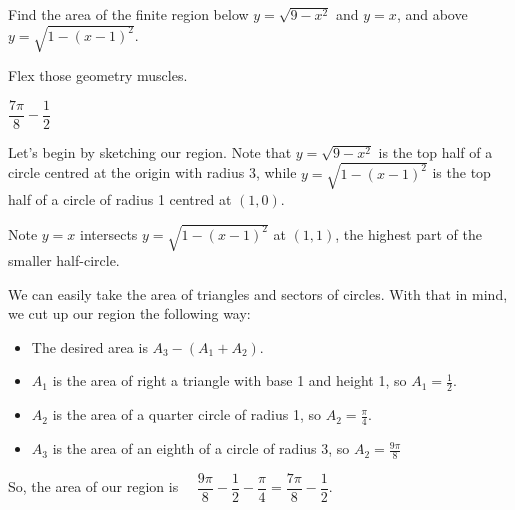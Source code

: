 \begin{question}
Find the area of the finite region below $y=\sqrt{9-x^2}$ and $y=x$, and above  $y=\sqrt{1-(x-1)^2}$.
\end{question}
\begin{hint}
Flex those geometry muscles.
\end{hint}
\begin{answer}
$\dfrac{7\pi}{8}-\dfrac{1}{2}$
\end{answer}
\begin{solution}
Let's begin by sketching our region. Note that $y=\sqrt{9-x^2}$ is the top half of a circle centred at the origin with radius 3, while $y=\sqrt{1-(x-1)^2}$ is the top half of a circle of radius 1 centred at $(1,0)$.
\begin{center}
\end{center}

Note $y=x$ intersects $y=\sqrt{1-(x-1)^2}$ at $(1,1)$, the highest part of the smaller half-circle.

We can easily take the area of  triangles and sectors of circles. With that in mind, we cut up our region the following way:

\begin{center}
\end{center}
\begin{itemize}
\item The desired area is $A_3-(A_1+A_2)$.
\item $A_1$ is the area of right a triangle with base 1 and height 1, so $A_1 = \frac{1}{2}$.
\item $A_2$ is the area of a quarter circle of radius 1, so $A_2=\frac{\pi}{4}$.
\item $A_3$ is the area of an eighth of a circle of radius 3, so $A_2 = \frac{9\pi}{8}$
\end{itemize}
So, the area of our region is~~ $\dfrac{9\pi}{8} - \dfrac{1}{2}-\dfrac{\pi}{4}=\dfrac{7\pi}{8}-\dfrac{1}{2}$.
\end{solution}

